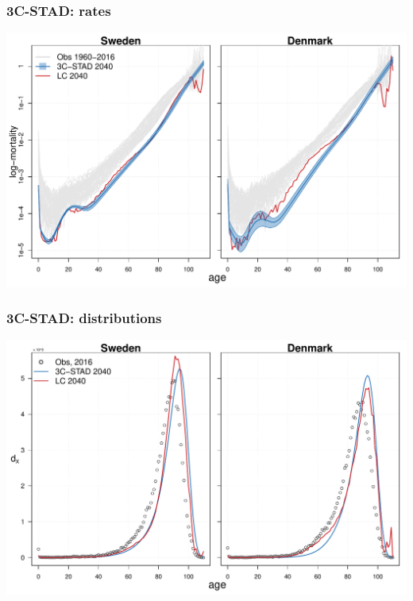 \documentclass[12pt, xcolor=table]{beamer}  %
\begin{document}
\begin{frame}[noframenumbering]\frametitle{3C-STAD: rates}

\vspace{-0.5cm}
	
	\begin{center}	
		\vspace{0.2cm}
		
		\includegraphics[scale=.42]{Figures/Ch3/F_rates}
		
	\end{center}
	
\end{frame}

\begin{frame}[noframenumbering]\frametitle{3C-STAD: distributions}

\vspace{-0.5cm}

	
	\begin{center}	
		\vspace{0.2cm}
		
		\includegraphics[scale=.42]{Figures/Ch3/F_dist}
		
	\end{center}
	
\end{frame}
\end{document}
